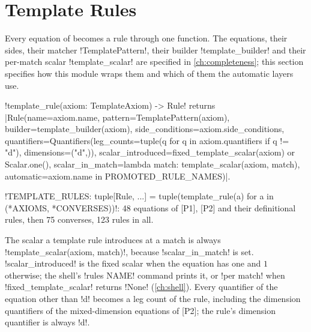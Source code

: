 \section{Template Rules}\label{sec:rules-templates}

Every equation of  becomes a rule through one function. The equations, their sides, their matcher \py!TemplatePattern!, their builder \py!template_builder! and their per-match scalar \py!template_scalar! are specified in \cref{ch:completeness}; this section specifies how this module wraps them and which of them the automatic layers use.

\begin{signature}
\py!template_rule(axiom: TemplateAxiom) -> Rule! returns
\py|Rule(name=axiom.name, pattern=TemplatePattern(axiom), builder=template_builder(axiom), side_conditions=axiom.side_conditions, quantifiers=Quantifiers(leg_counts=tuple(q for q in axiom.quantifiers if q != "d"), dimensions=("d",)), scalar_introduced=fixed_template_scalar(axiom) or Scalar.one(), scalar_in_match=lambda match: template_scalar(axiom, match), automatic=axiom.name in PROMOTED_RULE_NAMES)|.

\py!TEMPLATE_RULES: tuple[Rule, ...] = tuple(template_rule(a) for a in (*AXIOMS, *CONVERSES))!: 48 equations of [P1], [P2] and their definitional rules, then 75 converses, 123 rules in all.
\end{signature}

The scalar a template rule introduces at a match is always \py!template_scalar(axiom, match)!, because \py!scalar_in_match! is set. \py!scalar_introduced! is the fixed scalar when the equation has one and $1$ otherwise; the shell's \azx!rules NAME! command prints it, or \code!per match! when \py!fixed_template_scalar! returns \py!None! (\cref{ch:shell}). Every quantifier of the equation other than \code!d! becomes a leg count of the rule, including the dimension quantifiers of the mixed-dimension equations of [P2]; the rule's dimension quantifier is always \code!d!.

